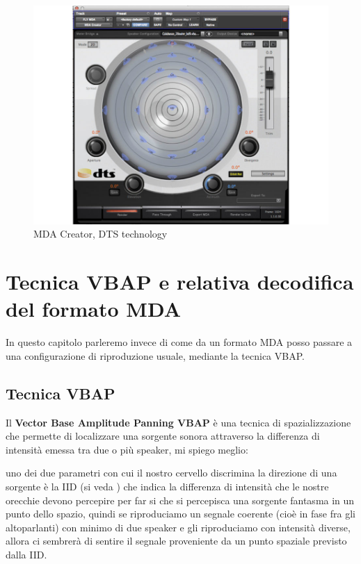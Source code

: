 \documentclass[12pt,a4paper]{report}
\begin{document}
\begin{figure}[htbp]
	\centering
	\includegraphics[scale=0.50]{figures/mdacreator.jpg}

	\caption {MDA Creator, DTS technology}
	\label{fig:mdacreator}
	\end{figure}

\chapter{Tecnica VBAP e relativa decodifica del formato MDA}

In questo capitolo parleremo invece di come da un formato MDA posso passare a una configurazione di riproduzione usuale, mediante la tecnica VBAP.

\section{Tecnica VBAP}

Il \textbf{Vector Base Amplitude Panning VBAP} è una tecnica di spazializzazione che permette di localizzare una sorgente sonora attraverso la differenza di intensità emessa tra due o più speaker, mi spiego meglio:

uno dei due parametri con cui il nostro cervello discrimina la direzione di una sorgente è la IID (si veda \cite{iid}) che indica la differenza di intensità che le nostre orecchie devono percepire per far si che si percepisca una sorgente fantasma in un punto dello spazio, quindi se riproduciamo un segnale coerente (cioè in fase fra gli altoparlanti) con minimo di due speaker e gli riproduciamo con intensità diverse, allora ci sembrerà di sentire il segnale proveniente da un punto spaziale previsto dalla IID.
\end{document}
